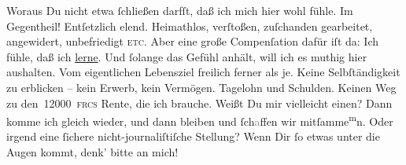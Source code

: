 \pstart
           Woraus Du nicht etwa{ }ſchließen darfſt, daß ich mich hier wohl fühle. {\pb}Im Gegentheil! Entſetzlich elend. Heimathlos,
               verſtoßen, zuſchanden gearbeitet, angewidert, unbefriedigt \textsc{etc}. Aber eine große Compenſation dafür iſt da: Ich fühle, daß ich \uline{lerne}. Und{ }ſolange das Gefühl anhält, will ich es
               muthig hier aushalten. Vom eigentlichen Lebensziel freilich ferner als je. Keine
               Selbſtändigkeit zu erblicken – kein Erwerb, kein Vermögen. Tagelohn und Schulden. {\pb}Keinen Weg zu den 12000 \textsc{frcs} Rente, die ich brauche. Weißt Du mir vielleicht einen? Dann komme ich
               gleich wieder, und dann bleiben und{ }ſch\textcolor{gray}{a}ffen wir mitſamme\substVorne{}\textsuperscript{m}\substDazwischen{}n\substHinten{}. Oder irgend eine{ }ſichere nicht-journaliſtiſche Stellung? Wenn Dir{ }ſo etwas
               unter die Augen kommt, denk’ bitte an mich! {\dotsfour}\pend
           
